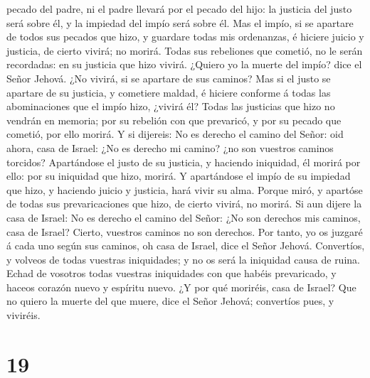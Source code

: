 pecado del padre, ni el padre llevará por el pecado del hijo: la
justicia del justo será sobre él, y la impiedad del impío será sobre él.
 Mas el impío, si se apartare de todos sus pecados que
hizo, y guardare todas mis ordenanzas, é hiciere juicio y justicia, de
cierto vivirá; no morirá.  Todas sus rebeliones que
cometió, no le serán recordadas: en su justicia que hizo vivirá.
 ¿Quiero yo la muerte del impío? dice el Señor Jehová. ¿No
vivirá, si se apartare de sus caminos?  Mas si el justo se
apartare de su justicia, y cometiere maldad, é hiciere conforme á todas
las abominaciones que el impío hizo, ¿vivirá él? Todas las justicias que
hizo no vendrán en memoria; por su rebelión con que prevaricó, y por su
pecado que cometió, por ello morirá.  Y si dijereis: No es
derecho el camino del Señor: oid ahora, casa de Israel: ¿No es derecho
mi camino? ¿no son vuestros caminos torcidos?  Apartándose
el justo de su justicia, y haciendo iniquidad, él morirá por ello: por
su iniquidad que hizo, morirá.  Y apartándose el impío de
su impiedad que hizo, y haciendo juicio y justicia, hará vivir su alma.
 Porque miró, y apartóse de todas sus prevaricaciones que
hizo, de cierto vivirá, no morirá.  Si aun dijere la casa
de Israel: No es derecho el camino del Señor: ¿No son derechos mis
caminos, casa de Israel? Cierto, vuestros caminos no son derechos.
 Por tanto, yo os juzgaré á cada uno según sus caminos, oh
casa de Israel, dice el Señor Jehová. Convertíos, y volveos de todas
vuestras iniquidades; y no os será la iniquidad causa de ruina.
 Echad de vosotros todas vuestras iniquidades con que
habéis prevaricado, y haceos corazón nuevo y espíritu nuevo. ¿Y por qué
moriréis, casa de Israel?  Que no quiero la muerte del que
muere, dice el Señor Jehová; convertíos pues, y viviréis.

\hypertarget{section-18}{%
\section{19}\label{section-18}}

